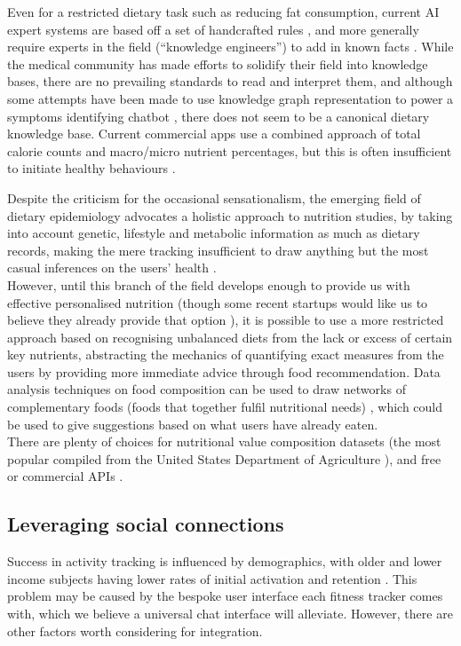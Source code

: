 Even for a restricted dietary task such as reducing fat consumption, current AI expert systems are based off a set of handcrafted rules \cite{Prochaska2005}, and more generally require experts in the field (``knowledge engineers'') to add in known facts \cite{Chen2012}. While the medical community has made efforts to solidify their field into knowledge bases, there are no prevailing standards to read and interpret them, and although some attempts have been made to use knowledge graph representation to power a symptoms identifying chatbot \cite{minutoloa2017conversational}, there does not seem to be a canonical dietary knowledge base. Current commercial apps use a combined approach of total calorie counts and macro/micro nutrient percentages, but this is often insufficient to initiate healthy behaviours \cite{Davis2016}.

Despite the criticism for the occasional sensationalism, the emerging field of dietary epidemiology advocates a holistic approach to nutrition studies, by taking into account genetic, lifestyle and metabolic information as much as dietary records, making the mere tracking insufficient to draw anything but the most casual inferences on the users' health \cite{byers2001food}. \\
However, until this branch of the field develops enough to provide us with effective personalised nutrition (though some recent startups would like us to believe they already provide that option \cite{habitwebsite}), it is possible to use a more restricted approach based on recognising unbalanced diets from the lack or excess of certain key nutrients, abstracting the mechanics of quantifying exact measures from the users by providing more immediate advice through food recommendation. Data analysis techniques on food composition can be used to draw networks of complementary foods (foods that together fulfil nutritional needs) \cite{Kim2015a}, which could be used to give suggestions based on what users have already eaten. \\
There are plenty of choices for nutritional value composition datasets (the most popular compiled from the United States Department of Agriculture \cite{usda}), and free or commercial APIs \cite{foodapis}.
\subsection{Leveraging social connections}
Success in activity tracking is influenced by demographics, with older and lower income subjects having lower rates of initial activation and retention \cite{Patel2017}. This problem may be caused by the bespoke user interface each fitness tracker comes with, which we believe a universal chat interface will alleviate. However, there are other factors worth considering for integration. 

